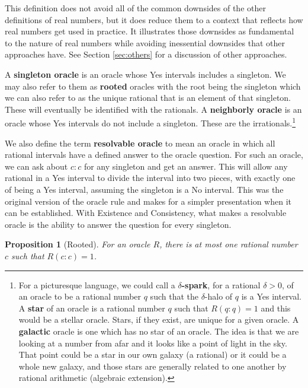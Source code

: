 \documentclass[12pt]{article}
\newtheorem{proposition}{Proposition}[subsection]
\begin{document}
This definition does not avoid all of the common downsides of the other definitions of real numbers, but it does reduce them to a context that reflects how real numbers get used in practice. It illustrates those downsides as fundamental to the nature of real numbers while avoiding inessential downsides that other approaches have. See Section \ref{sec:others} for a discussion of other approaches.  


A \textbf{singleton oracle }is an oracle whose Yes intervals includes a singleton. We may also refer to them as \textbf{rooted} oracles with the root being the singleton which we can also refer to as the unique rational that is an element of that singleton. These will eventually be identified with the rationals. A \textbf{neighborly oracle} is an oracle whose Yes intervals do not include a singleton. These are the irrationals.\footnote{For a picturesque language, we could call a \textbf{$\delta$-spark}, for a rational $\delta > 0$, of an oracle to be a rational number $q$ such that the $\delta$-halo of $q$ is a Yes interval. A \textbf{star} of an oracle is a rational number $q$ such that $R(q:q) = 1$ and this would be a stellar oracle. Stars, if they exist, are unique for a given oracle. A \textbf{galactic} oracle is one which has no star of an oracle. The idea is that we are looking at a number from afar and it looks like a point of light in the sky. That point could be a star in our own galaxy (a rational) or it could be a whole new galaxy, and those stars are generally related to one another by rational arithmetic (algebraic extension).}

We also define the term \textbf{resolvable oracle} to mean an oracle in which all rational intervals have a defined answer to the oracle question. For such an oracle, we can ask about $c:c$ for any singleton and get an answer. This will allow any rational in a Yes interval to divide the interval into two pieces, with exactly one of being a Yes interval, assuming the singleton is a No interval. This was the original version of the oracle rule and makes for a simpler presentation when it can be established. With Existence and Consistency, what makes a resolvable oracle is the ability to answer the question for every singleton. 

\begin{proposition}[Rooted]\label{pr:rooted}
    For an oracle $R$, there is at most one rational number $c$ such that $R(c:c)=1$.
\end{proposition}
\end{document}
